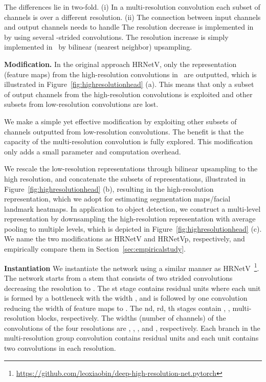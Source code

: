 \documentclass[10pt,twocolumn,letterpaper]{article}
\begin{document}
The differences lie in two-fold.
(i) In a multi-resolution convolution
each subset of channels is over a different resolution.
(ii)
The connection between input channels
and output channels
needs to handle
The resolution decrease is
implemented in~\cite{SunXLW19}
by using several -strided  convolutions.
The resolution increase is simply implemented in~\cite{SunXLW19}
by bilinear (nearest neighbor) upsampling.

\vspace{.1cm}
\noindent\textbf{Modification.}
In the original approach HRNetV,
only the representation (feature maps)
from the high-resolution convolutions
in~\cite{SunXLW19}
are outputted,
which is illustrated in Figure~\ref{fig:highresolutionhead} (a).
This means that
only a subset of output channels
from the high-resolution convolutions
is exploited
and other subsets from low-resolution convolutions are lost.

We make a simple yet effective modification
by exploiting other subsets of channels
outputted from low-resolution convolutions.
The benefit is that the capacity of the multi-resolution
convolution is fully explored.
This modification only adds a small parameter and computation overhead.

We rescale the low-resolution representations through bilinear upsampling
to the high resolution,
and concatenate the subsets of representations,
illustrated in Figure~\ref{fig:highresolutionhead} (b),
resulting in the high-resolution representation,
which we adopt for estimating segmentation maps/facial landmark heatmaps.
In application to object detection,
we construct a multi-level representation
by downsampling the high-resolution representation
with average pooling
to multiple levels,
which is depicted in Figure~\ref{fig:highresolutionhead} (c).
We name the two modifications as HRNetV and HRNetVp, respectively,
and empirically compare them in Section~\ref{sec:empiricalstudy}.

\vspace{.1cm}
\noindent\textbf{Instantiation}
We instantiate the network using a similar manner as HRNetV~\cite{SunXLW19}\footnote{\url{https://github.com/leoxiaobin/deep-high-resolution-net.pytorch}}.
The network starts from a stem
that consists of two strided  convolutions
decreasing the resolution to .
The st stage contains  residual units
where each unit
is formed by a bottleneck with the width ,
and is followed by one  convolution
reducing the width of feature maps
to .
The nd, rd, th stages
contain , ,  multi-resolution blocks, respectively.
The widths (number of channels) of the convolutions
of the four resolutions
are , , , and , respectively.
Each branch in the multi-resolution group convolution
contains  residual units
and each unit contains two  convolutions in each resolution.
\end{document}
